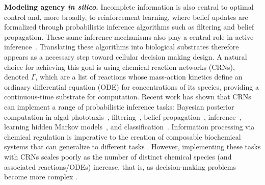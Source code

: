\documentclass{article}
\theoremstyle{plain}
\theoremstyle{definition}
\theoremstyle{remark}
\newcommand{\<}{\langle}
\renewcommand{\>}{\rangle}
\begin{document}
\textbf{Modeling agency \emph{in silico}.}
Incomplete information is also central to optimal control and, more broadly, to reinforcement learning, where belief updates are formalized through probabilistic inference algorithms such as filtering and belief propagation. These same inference mechanisms also play a central role in active inference~\cite{PEZZULO2024108741}. Translating these algorithms into biological substrates therefore appears as a necessary step toward cellular decision making design. A natural choice for achieving this goal is using chemical reaction networks (CRNs), denoted $\Gamma$, which are a list of reactions whose mass-action kinetics define an ordinary differential equation (ODE) for concentrations of its species, providing a continuous-time substrate for computation. Recent work has shown that CRNs can implement a range of probabilistic inference tasks: Bayesian posterior computation in algal phototaxis~\cite{COLLIAUX2017385}, filtering~\cite{PhysRevResearch.4.013120, PhysRevLett.126.128102}, belief propagation~\cite{NIPS2013_e5e63da7}, inference~\cite{10.1007/978-3-319-66799-7_14}, learning hidden Markov models~\cite{10.1098/rsif.2022.0877}, and classification~\cite{Moghimianavval2024, vanderLinden2022}. %
Information processing via chemical regulation is imperative to the creation of composable biochemical systems that can generalize to different tasks \cite{cardelli2018programmingdiscretedistributionschemical,brijder2018computingchemicalreactionnetworks, Tschantz764969, DBLP:journals/corr/abs-2109-11422, 10.1007/978-3-030-00030-1_12}. However, implementing these tasks with CRNs scales poorly as the number of distinct chemical species (and associated reactions/ODEs) increase, that is, as decision-making problems become more complex \cite{NIPS2013_e5e63da7,73126f2a-e40e-3d3e-93a2-fef7cb70f6e4, 10.1007/978-3-030-00030-1_12, 10.1098/rsif.2022.0877, 10.1007/978-3-319-66799-7_14}.

\end{document}
